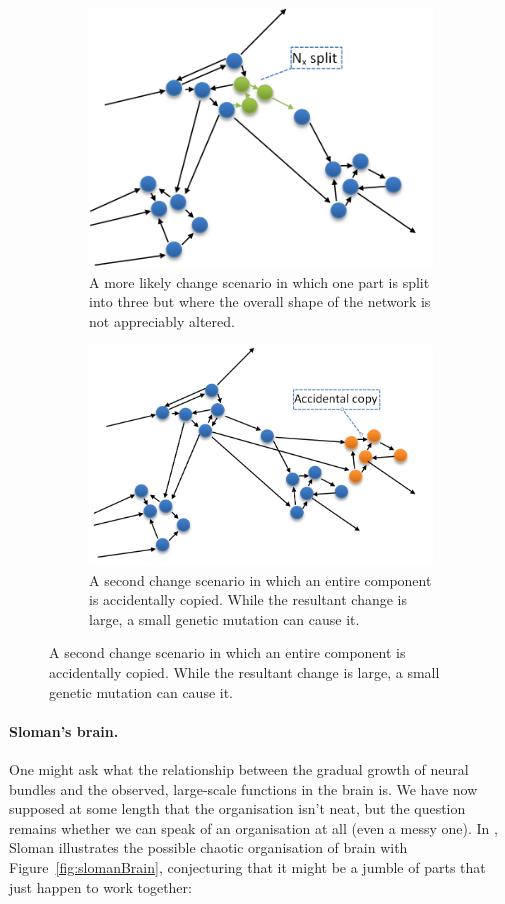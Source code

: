 \begin{figure}
\begin{subfigure}[t]{0.45\textwidth}
		\includegraphics[width=\textwidth]{figs/likelyEvolution.png}
		\caption{A more likely change scenario in which one part is split into three but where the overall shape of the network is not appreciably altered.}
		\label{fig:likelyEvolution}
	\end{subfigure}
	\begin{subfigure}[t]{0.49\textwidth}
		\includegraphics[width=\textwidth]{figs/copyEvolution.png}
		\caption{A second change scenario in which an entire component is accidentally copied. While the resultant change is large, a small genetic mutation can cause it.}
		\label{fig:copyEvolution}
	\end{subfigure}
\end{figure}

\paragraph{Sloman's brain.} One might ask what the relationship between the gradual growth of neural bundles and the observed, large-scale functions in the brain is. We have now supposed at some length that the organisation isn't neat, but the question remains whether we can speak of an organisation at all (even a messy one). In \cite[p. 8]{sloman2000}, Sloman illustrates the possible chaotic organisation of brain with Figure~\ref{fig:slomanBrain}, conjecturing that it might be a jumble of parts that just happen to work together:

